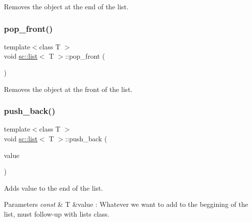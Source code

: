 Removes the object at the end of the list. 

\mbox{\label{classsc_1_1list_ab3fbf66643f4356cf0c1947bd4fdf48e}} 
\subsubsection{\texorpdfstring{pop\+\_\+front()}{pop\_front()}}
{\footnotesize\ttfamily template$<$class T $>$ \\
void \mbox{\hyperlink{classsc_1_1list}{sc\+::list}}$<$ T $>$\+::pop\+\_\+front (\begin{DoxyParamCaption}{ }\end{DoxyParamCaption})}



Removes the object at the front of the list. 

\mbox{\label{classsc_1_1list_a1d77cdaeacca7959989873617a753c96}} 
\subsubsection{\texorpdfstring{push\+\_\+back()}{push\_back()}}
{\footnotesize\ttfamily template$<$class T $>$ \\
void \mbox{\hyperlink{classsc_1_1list}{sc\+::list}}$<$ T $>$\+::push\+\_\+back (\begin{DoxyParamCaption}\item[{const T \&}]{value }\end{DoxyParamCaption})}



Adds {\ttfamily value} to the end of the list. 


\begin{DoxyParams}{Parameters}
{\em const} & T \&value \+: Whatever we want to add to the beggining of the list, must follow-\/up with list\textquotesingle{}s class. \\
\hline
\end{DoxyParams}
\mbox{\label{classsc_1_1list_a24a7b8a81765dfe0351ddb263bc6d754}} 
